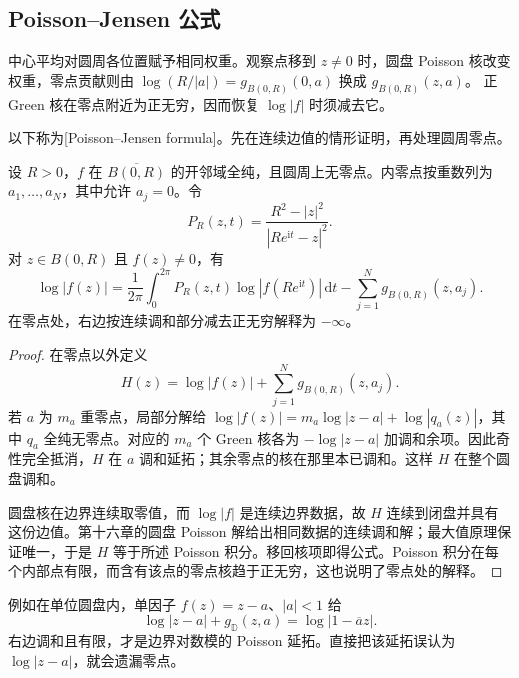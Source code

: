 \subsection{Poisson–Jensen 公式}
\label{b3:subsec:180202}

中心平均对圆周各位置赋予相同权重。观察点移到 \(z\ne0\) 时，圆盘 Poisson 核改变权重，零点贡献则由
\(\log(R/|a|)=g_{B(0,R)}(0,a)\) 换成 \(g_{B(0,R)}(z,a)\)。
正 Green 核在零点附近为正无穷，因而恢复 \(\log|f|\) 时须减去它。

\ProseParagraphBreak
以下称为[Poisson--Jensen formula]。先在连续边值的情形证明，再处理圆周零点。

\begin{theorem}\label{b3:thm:18-poisson-jensen}
设 \(R>0\)，\(f\) 在 \(\overline{B(0,R)}\) 的开邻域全纯，且圆周上无零点。内零点按重数列为 \(a_1,\ldots,a_N\)，其中允许 \(a_j=0\)。令
\[
 P_R(z,t)=\frac{R^2-|z|^2}{|Re^{\mathrm it}-z|^2}.
\]
对 \(z\in B(0,R)\) 且 \(f(z)\ne0\)，有
\begin{equation}\label{b3:eq:18-poisson-jensen}
 \log|f(z)|=\frac1{2\pi}\int_0^{2\pi}
 P_R(z,t)\log|f(Re^{\mathrm it})|\,\mathrm dt
 -\sum_{j=1}^Ng_{B(0,R)}(z,a_j).
\end{equation}
在零点处，右边按连续调和部分减去正无穷解释为 \(-\infty\)。
\end{theorem}
\begin{proof}
在零点以外定义
\[
 H(z)=\log|f(z)|+\sum_{j=1}^Ng_{B(0,R)}(z,a_j).
\]
若 \(a\) 为 \(m_a\) 重零点，局部分解给
\(\log|f(z)|=m_a\log|z-a|+\log|q_a(z)|\)，其中 \(q_a\) 全纯无零点。对应的 \(m_a\) 个 Green 核各为
\(-\log|z-a|\) 加调和余项。因此奇性完全抵消，\(H\) 在 \(a\) 调和延拓；其余零点的核在那里本已调和。这样 \(H\) 在整个圆盘调和。

圆盘核在边界连续取零值，而 \(\log|f|\) 是连续边界数据，故 \(H\) 连续到闭盘并具有这份边值。第十六章的圆盘 Poisson 解给出相同数据的连续调和解；最大值原理保证唯一，于是 \(H\) 等于所述 Poisson 积分。移回核项即得公式。Poisson 积分在每个内部点有限，而含有该点的零点核趋于正无穷，这也说明了零点处的解释。
\end{proof}

例如在单位圆盘内，单因子 \(f(z)=z-a\)、\(|a|<1\) 给
\[
 \log|z-a|+g_{\mathbb D}(z,a)=\log|1-\overline a z|.
\]
右边调和且有限，才是边界对数模的 Poisson 延拓。直接把该延拓误认为 \(\log|z-a|\)，就会遗漏零点。

